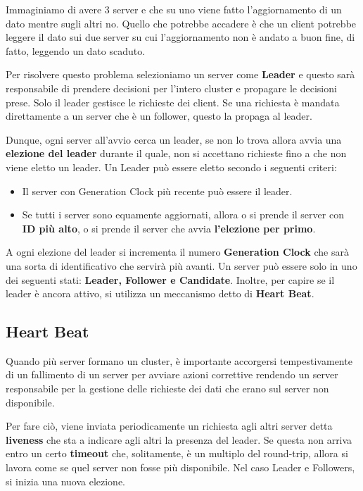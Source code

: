 Immaginiamo di avere 3 server e che su uno viene fatto l'aggiornamento di un dato mentre sugli altri no. Quello che potrebbe accadere è che un client potrebbe leggere il dato sui due server su cui l'aggiornamento non è andato a buon fine, di fatto, leggendo un dato scaduto. 

Per risolvere questo problema selezioniamo un server come \textbf{Leader} e questo sarà responsabile di prendere decisioni per l'intero cluster e propagare le decisioni prese. Solo il leader gestisce le richieste dei client. Se una richiesta è mandata direttamente a un server che è un follower, questo la propaga al leader. 

Dunque, ogni server all’avvio cerca un leader, se non lo trova allora avvia una \textbf{elezione del leader} durante il quale, non si accettano richieste fino a che non viene eletto un leader. Un Leader può essere eletto secondo i seguenti criteri:
\begin{itemize}
    \item Il server con Generation Clock più recente può essere il leader.
    \item Se tutti i server sono equamente aggiornati, allora o si prende il server con \textbf{ID più alto}, o si prende il server che avvia \textbf{l'elezione per primo}.
\end{itemize}

A ogni elezione del leader si incrementa il numero \textbf{Generation Clock} che sarà una sorta di identificativo che servirà più avanti. Un server può essere solo in uno dei seguenti stati: \textbf{Leader, Follower e Candidate}.
Inoltre, per capire se il leader è ancora attivo, si utilizza un meccanismo detto di \textbf{Heart Beat}. 

\subsection{Heart Beat}
Quando più server formano un cluster, è importante accorgersi tempestivamente di un fallimento di un server per avviare azioni correttive rendendo un server responsabile per la gestione delle richieste dei dati che erano sul server non disponibile. 

Per fare ciò, viene inviata periodicamente un richiesta agli altri server detta \textbf{liveness} che sta a indicare agli altri la presenza del leader. Se questa non arriva entro un certo \textbf{timeout} che, solitamente, è un multiplo del round-trip, allora si lavora come se quel server non fosse più disponibile. Nel caso Leader e Followers, si inizia una nuova elezione. 

